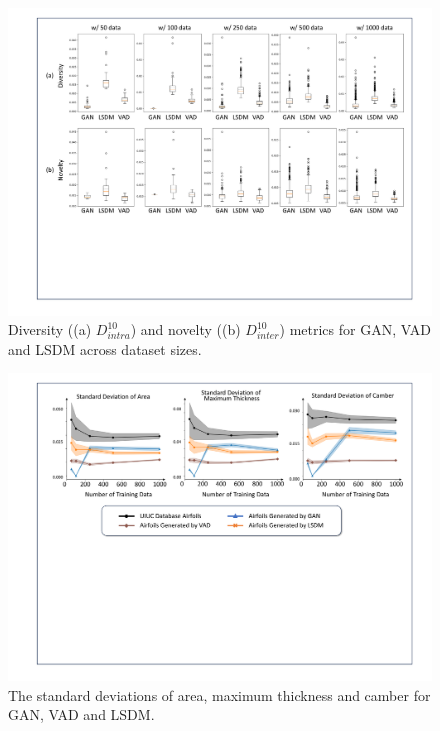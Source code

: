 \begin{figure}[!t]
    \begin{center}
        \includegraphics[width=1\linewidth]{chapter6/fig/fig_uncond_inter_intra_dist_updated.pdf}
    \end{center}
    \vspace{-4mm}
    \caption{
        \small Diversity ((a) $D_{intra}^{10}$) and novelty  ((b) $D_{inter}^{10}$) metrics for GAN, VAD and LSDM across dataset sizes. 
    }
    \label{ch6:fig:main_benchmark_unconditional_intra_inter_dist}
\end{figure}

\begin{figure}[!t]
    \begin{center}
        \includegraphics[width=1\linewidth]{chapter6/fig/fig_uncon_std_updated.pdf}
    \end{center}
    \vspace{-2mm}
    \caption{
        \small The standard deviations of area, maximum thickness and camber for GAN, VAD and LSDM. 
    }
    \label{ch6:fig:main_benchmark_unconditional_std}
\end{figure}

